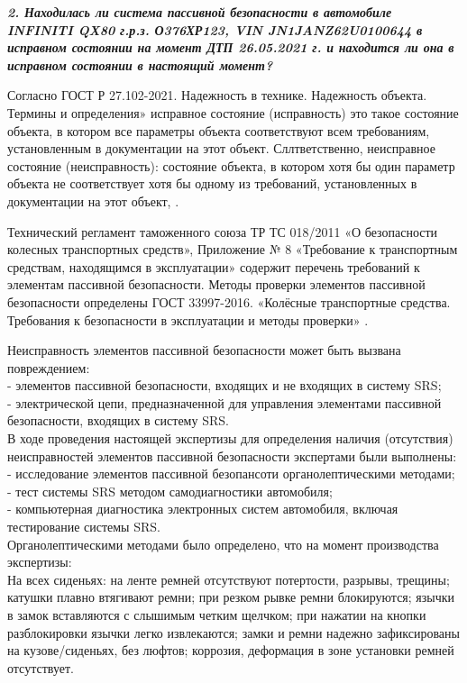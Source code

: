 \textbf{\textsl{2.	Находилась ли система пассивной безопасности в автомобиле INFINITI QX80 г.р.з. О376ХР123, VIN JN1JANZ62U0100644 в исправном состоянии на момент ДТП 26.05.2021 г. и находится ли она в исправном состоянии в настоящий момент?}}
\par

Согласно ГОСТ Р 27.102-2021. Надежность в технике. Надежность объекта. Термины и определения» исправное состояние (исправность) это такое состояние объекта, в котором все параметры объекта соответствуют всем требованиям, установленным в документации на этот объект. Сллтветственно, неисправное состояние (неисправность): состояние объекта, в котором хотя бы один параметр объекта не соответствует хотя бы одному из требований, установленных в документации на этот объект,  \cite[п. 12, п.13]{271022021:gost}. 

 Технический регламент таможенного союза ТР ТС 018/2011 «О безопасности колесных транспортных средств», Приложение № 8 «Требование к транспортным средствам, находящимся в эксплуатации» содержит перечень требований к элементам пассивной безопасности. Методы проверки элементов пассивной безопасности определены ГОСТ 33997-2016. «Колёсные транспортные средства. Требования к безопасности в эксплуатации и методы проверки» \cite{33997:gost}. 


Неисправность элементов пассивной безопасности  может быть вызвана повреждением:\\
-	элементов пассивной безопасности, входящих и не входящих в систему SRS;\\
-	электрической цепи, предназначенной для управления элементами пассивной безопасности, входящих в систему SRS.\\

В ходе проведения настоящей экспертизы для определения наличия (отсутствия) неисправностей элементов пассивной безопасности экспертами  были выполнены:\\
- исследование элементов пассивной безопансоти органолептическими методами;\\
- тест системы SRS методом самодиагностики автомобиля;\\
- компьютерная диагностика электронных систем автомобиля, включая тестирование системы SRS.\\

Органолептическими методами было определено, что на момент производства экспертизы:\\

На всех сиденьях: на ленте ремней отсутствуют потертости, разрывы, трещины; катушки  плавно  втягивают ремни; при резком рывке ремни  блокируются; язычки в замок вставляются с слышимым четким щелчком; при нажатии на кнопки разблокировки язычки  легко извлекаются;
замки и ремни надежно зафиксированы на кузове/сиденьях, без люфтов; коррозия, деформация в зоне установки ремней отсутствует.

